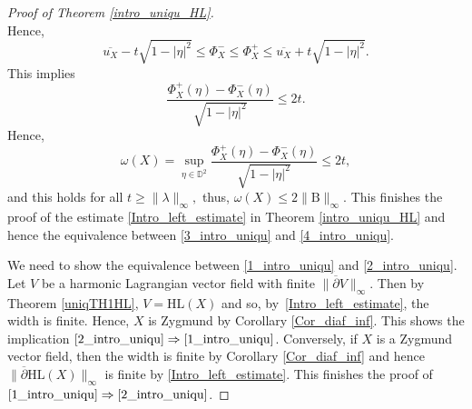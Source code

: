 \documentclass[JEP,XML,SOM,Unicode,NoEqCountersInSection, NoFloatCountersInSection,published]{cedram}
\theoremstyle{plain}
\theoremstyle{definition}
\newcommand{\B}{\mathrm{B}}
\begin{document}
\begin{proof}[Proof of Theorem \ref{intro_uniqu_HL}]
\[\]
Hence,
\[
\overline{u_X} - t \sqrt{1 - \lvert \eta \rvert^2} \leq \Phi_X^- \leq \Phi_X^+ \leq \overline{u_X} + t \sqrt{1 - \lvert \eta \rvert^2}.
\]
This implies
\[
\frac{\Phi_X^+(\eta) - \Phi_X^-(\eta)}{\sqrt{1 - \lvert \eta \rvert^2}} \leq 2t.
\]
Hence,
\[
\omega(X) = \sup_{\eta \in \mathbb{D}^2} \frac{\Phi_X^+(\eta) - \Phi_X^-(\eta)}{\sqrt{1 - \lvert \eta \rvert^2}} \leq 2t,
\]
and this holds for all \(t \geq \lVert \lambda \rVert_{\infty}, \) thus, \(\omega(X) \leq 2 \lVert \B\rVert_{\infty}. \) This finishes the proof of the estimate \eqref{Intro_left_estimate} in Theorem \ref{intro_uniqu_HL} and hence the equivalence between \eqref{3_intro_uniqu} and \eqref{4_intro_uniqu}.

We need to show the equivalence between \eqref{1_intro_uniqu} and \eqref{2_intro_uniqu}. Let \(V\) be a harmonic Lagrangian vector field with finite \(\lVert \overline{\partial} V \rVert_{\infty}\). Then by Theorem \ref{uniqTH1HL}, \(V = \mathrm{HL}(X)\) and so, by~\eqref{Intro_left_estimate}, the width is finite. Hence, \(X\) is Zygmund by Corollary \ref{Cor_diaf_inf}. This shows the implication $\eqref{2_intro_uniqu} \Rightarrow \eqref{1_intro_uniqu}$. Conversely, if \(X\) is a Zygmund vector field, then the width is finite by Corollary \ref{Cor_diaf_inf} and hence \(\lVert \overline{\partial} \mathrm{HL}(X) \rVert_{\infty}\) is finite by \eqref{Intro_left_estimate}. This finishes the proof of $\eqref{1_intro_uniqu} \Rightarrow\eqref{2_intro_uniqu}$.
\end{proof}
\end{document}
